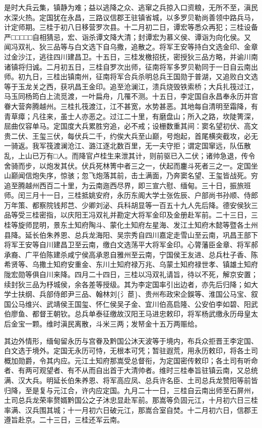 \documentclass[]{article}
\begin{document}
是时大兵云集，镇静为难；益以逃降之众、逃窜之兵掠入口资粮，无所不至，滇民水深火热。定国犹在永昌，三路议信郡王驻镇省城，以多罗贝勒尚善领中路兵马，计定师期。三桂于初八日移营罗次县。十二月初二日，谭宏等悉众再犯；三桂设备严□□□□□自相猜忌，宏、诣杀谭文降大清；封谭宏为慕义侯、谭诣为向化侯。又闻冯双礼、狄三品等与白文选下自乌撒，追散之。将军王安等持白文选金印、金章过金沙江，逃往四川建昌卫。十五日，三桂发檄招抚，密授狄三品方略，并谕川南诸镇将归诚。二月初五日，三桂自罗次出师，征南将军多罗贝勒同于一日自云南出师。初九日，三桂出镇南州，征南将军合兵杀明总兵王国勋于普湖，又追败白文选等于玉龙关之西，获巩昌王金印。追至沧澜江，溃兵烧毁铁索桥；大兵扎筏过江，马玉同杨筠白上流觅渡，一叶扁舟，几罹不测。十五日，李定国自永昌奉永历并宫眷大营奔腾越州。三桂扎筏渡江，江不甚宽，水势甚恶。其地每自清明至霜降，有青草瘴；凡往来，虽士人亦恶之。过江二十里，有磨盘山；所入之路，坎陡箐深，屈曲仅容单马。定国度大兵累胜穷追，必不戒；设栅数重其间：窦名望初伏、高文贵二伏、王玺三伏，每伏兵二千，约俟大兵至山巅，号炮起，首尾横突截攻，必无一骑返。我军筏渡澜沧江、潞江逐北数百里，无一夫守拒；谓定国窜远，队伍散乱，上山已万有□人。而降官卢桂生来泄其计，则前驱已入二伏；诸帅急退，传令舍骑而步，以炮发其伏。伏兵死林箐中者三之一，伏起而鏖斗死者三之一。定国坐山巅闻信炮失序，惊骇；忽飞炮落其前，击土满面，乃奔窦名望、王玺皆战死。穷追至腾越州西百二十里，为云南迤西尽界，即三宣六慰、缅甸。三十日，振旅班师。闰三月十一日，三桂抵姚安府，永历东阁大学士张佐辰、户部尚书孙顺、侍郎万年策、都察院钱邦芑、少卿刘泌、兵科胡显等一百五十九人先后降。德安侯狄三品等受三桂密指，以庆阳王冯双礼并勘定大将军金印及金册赴军前。二十三日，三桂等旋师昆明，景东土知府陶斗、蒙化土知府左星海、发江土知府木懿等暨各土州县降。延长伯朱养恩、总兵龙海阳、吴宗秀自四川嘉定走雪山至云南，巩昌王部下将军王安等自川建昌卫至云南，缴白文选荡平大将军金印。心膂藩臣金章、将军郝承裔、广平伯陈建杀咸宁侯高承恩自雅州至云南，宁国侯王友进、总兵杜子香、陈希贤等、乌撒土知府安重金、东川土知府禄万兆、乌蒙土知府禄世孝、镇雄土知府陇宏勋等俱自川来降。四月二十四日，三桂以冯双礼请旨，待以不死，解京安置；续封狄三品为杼城侯，余各差等授级。其为李定国率引出边者，亦先后归降；如大学士扶纲、兵部侍郎尹三品、翰林刘\{氵茞\}、贵州布政宋企鋘等、淮国公马宝、叙国公马维兴、武靖侯王国玺、怀仁侯吴子金、宜川伯高启隆、公安伯李如碧、阳武伯廖鱼、都督王朝钦。总兵单泰征缴故汉阳王马进忠敕印，将军杨武缴永历母皇太后金宝一颗。维时滇民离散，斗米三两；发帑金十五万两赈给。

其边外情形，缅甸留永历与宫眷及黔国公沐天波等于境内，布兵众拒晋王李定国、白文选于境外。定国无永历可恃，无根本可凭；暂驻遐荒，用永历敕印，将各土司概加勋爵，令其内应。元江土知府那嵩受总督衔，为定国密传敕印；各土司有听命者、有两可观望者、有不从而自出首于大清帅者。维时三桂奉旨驻镇云南，又总统满、汉大兵。明延长伯朱养恩、将军高应凤、总兵许名臣、土司总兵龙赞阳等前皆归降，至是复与元江合，许内应定国。九月二十一日，三桂自云南出师至石屏州，土司总兵龙荣率赘婿黔国公之子沐忠显赴军前。那嵩等负固元江，十月初六日三桂率满、汉兵围其城；十一月初六日破元江，那嵩合室自焚。十二月初六日，信郡王遵旨赴京。二十三日，三桂还军云南。
\end{document}
